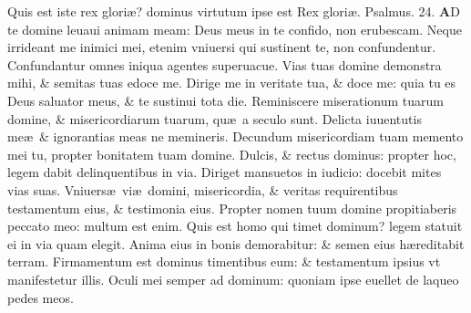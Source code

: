 \documentclass[a5paper,10pt]{book}
\def\ae{æ}
\begin{document}
\begin{multicols*}{2}
\newline \color{red} Q\color{black}uis est iste rex glori\ae ? dominus virtutum ipse est Rex glori\ae .
\newline \color{red} Psalmus. \hypertarget{ps24}{24.} \color{black}
\vspace{-.5em}
\lettrine[lines=2]{\bfseries \color{red} A}{}D te domine leuaui animam meam: Deus meus in te confido, non erubescam.
\newline \color{red} N\color{black}eque irrideant me inimici mei, etenim vniuersi qui sustinent te, non confundentur.
\newline \color{red} C\color{black}onfundantur omnes iniqua agentes superuacue.
\newline \color{red} V\color{black}ias tuas domine demonstra mihi, \& semitas tuas edoce me.
\newline \color{red} D\color{black}irige me in veritate tua, \& doce me: quia tu es Deus saluator meus, \& te sustinui tota die.
\newline \color{red} R\color{black}eminiscere miserationum tuarum domine, \& misericordiarum tuarum, qu\ae \ a seculo sunt.
\newline \color{red} D\color{black}elicta iuuentutis me\ae \ \& ignorantias meas ne memineris.
\newline \color{red} D\color{black}ecundum misericordiam tuam memento mei tu, propter bonitatem tuam domine.
\newline \color{red} D\color{black}ulcis, \& rectus dominus: propter hoc, legem dabit delinquentibus in via.
\newline \color{red} D\color{black}iriget mansuetos in iudicio: docebit mites vias suas.
\newline \color{red} V\color{black}niuers\ae \ vi\ae \ domini, misericordia, \& veritas requirentibus testamentum eius, \& testimonia eius.
\newline \color{red} P\color{black}ropter nomen tuum domine propitiaberis peccato meo: multum est enim.
\newline \color{red} Q\color{black}uis est homo qui timet dominum? legem statuit ei in via quam elegit.
\newline \color{red} A\color{black}nima eius in bonis demorabitur: \& semen eius h\ae reditabit terram.
\newline \color{red} F\color{black}irmamentum est dominus timentibus eum: \& testamentum ipsius vt manifestetur illis.
\newline \color{red} O\color{black}culi mei semper ad dominum: quoniam ipse euellet de laqueo pedes meos.

\end{multicols*}
\end{document}

